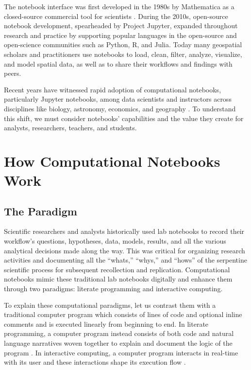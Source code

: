 \documentclass[11pt,letterpaper]{article}
\begin{document}
The notebook interface was first developed in the 1980s by Mathematica as a closed-source commercial tool for scientists \citep{somers_scientific_2018}. During the 2010s, open-source notebook development, spearheaded by Project Jupyter, expanded throughout research and practice by supporting popular languages in the open-source and open-science communities such as Python, R, and Julia. Today many geospatial scholars and practitioners use notebooks to load, clean, filter, analyze, visualize, and model spatial data, as well as to share their workflows and findings with peers.

Recent years have witnessed rapid adoption of computational notebooks, particularly Jupyter notebooks, among data scientists and instructors across disciplines like biology, astronomy, economics, and geography \citep{perkel_why_2018}. To understand this shift, we must consider notebooks' capabilities and the value they create for analysts, researchers, teachers, and students.

\section{How Computational Notebooks Work}

\subsection{The Paradigm}

Scientific researchers and analysts historically used lab notebooks to record their workflow's questions, hypotheses, data, models, results, and all the various analytical decisions made along the way. This was critical for organizing research activities and documenting all the \enquote{whats,} \enquote{whys,} and \enquote{hows} of the serpentine scientific process for subsequent recollection and replication. Computational notebooks mimic these traditional lab notebooks digitally and enhance them through two paradigms: literate programming and interactive computing.

To explain these computational paradigms, let us contrast them with a traditional computer program which consists of lines of code and optional inline comments and is executed linearly from beginning to end. In literate programming, a computer program instead consists of both code and natural language narratives woven together to explain and document the logic of the program \citep{knuth_literate_1992}. In interactive computing, a computer program interacts in real-time with its user and these interactions shape its execution flow \citep{perez_ipython:_2007}.
\end{document}
